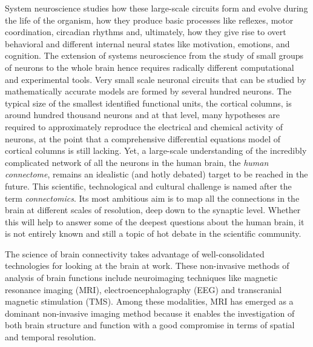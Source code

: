 System neuroscience studies how these large-scale circuits form and evolve during the life of the organism, how they produce basic processes like reflexes, motor coordination, circadian rhythms and, ultimately, how they give rise to overt behavioral and different internal neural states like motivation, emotions, and cognition.
The extension of systems neuroscience from the study of small groups of neurons to the whole brain hence requires radically different computational and experimental tools.
Very small scale neuronal circuits that can be studied by mathematically accurate models are formed by several hundred neurons. The typical size of the smallest identified functional units, the cortical columns, is around hundred thousand neurons and at that level, many hypotheses are required to approximately reproduce the electrical and chemical activity of neurons, at the point that a comprehensive differential equations model of cortical columns is still lacking. 
Yet, a large-scale understanding of the incredibly complicated network of all the neurons in the human brain, the \emph{human connectome}, remains an idealistic (and hotly debated) target to be reached in the future. This scientific, technological and cultural challenge is named after the term \emph{connectomics}. Its most ambitious aim is to map all the connections in the brain at different scales of resolution, deep down to the synaptic level. Whether this will help to answer some of the deepest questions about the human brain, it is not entirely known and still a topic of hot debate in the scientific community.

The science of brain connectivity takes advantage of well-consolidated technologies for looking at the brain at work. These non-invasive methods of analysis of brain functions include neuroimaging techniques like magnetic resonance imaging (MRI), electroencephalography (EEG) and transcranial magnetic stimulation (TMS).
Among these modalities, MRI has emerged as a dominant non-invasive imaging method because it enables the investigation of both brain structure and function with a good compromise in terms of spatial and temporal resolution.

